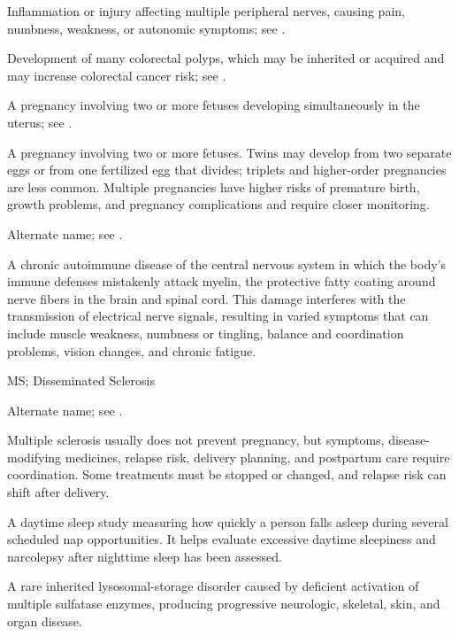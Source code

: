  Inflammation or injury affecting multiple peripheral nerves, causing pain, numbness, weakness, or autonomic symptoms; see .

 Development of many colorectal polyps, which may be inherited or acquired and may increase colorectal cancer risk; see .

 A pregnancy involving two or more fetuses developing simultaneously in the uterus; see .

 A pregnancy involving two or more fetuses. Twins may develop from two separate eggs or from one fertilized egg that divides; triplets and higher-order pregnancies are less common. Multiple pregnancies have higher risks of premature birth, growth problems, and pregnancy complications and require closer monitoring.

 Alternate name; see .

 A chronic autoimmune disease of the central nervous system in which the body's immune defenses mistakenly attack myelin, the protective fatty coating around nerve fibers in the brain and spinal cord. This damage interferes with the transmission of electrical nerve signals, resulting in varied symptoms that can include muscle weakness, numbness or tingling, balance and coordination problems, vision changes, and chronic fatigue.

\synonyms
MS; Disseminated Sclerosis

 Alternate name; see .

 Multiple sclerosis usually does not prevent pregnancy, but symptoms, disease-modifying medicines, relapse risk, delivery planning, and postpartum care require coordination. Some treatments must be stopped or changed, and relapse risk can shift after delivery.

 A daytime sleep study measuring how quickly a person falls asleep during several scheduled nap opportunities. It helps evaluate excessive daytime sleepiness and narcolepsy after nighttime sleep has been assessed.

 A rare inherited lysosomal-storage disorder caused by deficient activation of multiple sulfatase enzymes, producing progressive neurologic, skeletal, skin, and organ disease.


